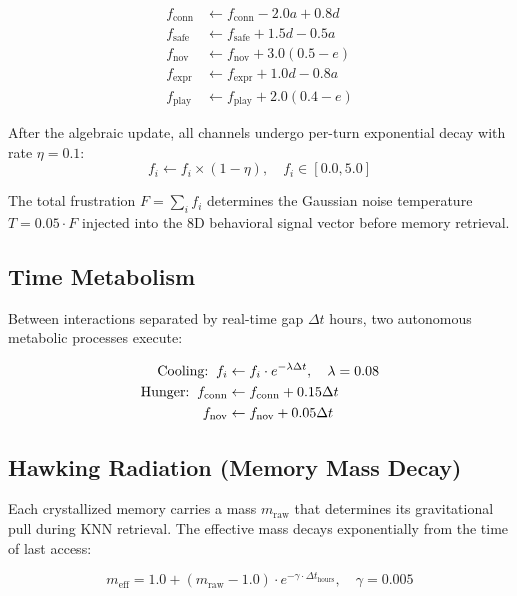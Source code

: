\begin{align}
  f_{\text{conn}} &\leftarrow f_{\text{conn}} - 2.0a + 0.8d \\
  f_{\text{safe}} &\leftarrow f_{\text{safe}} + 1.5d - 0.5a \\
  f_{\text{nov}} &\leftarrow f_{\text{nov}} + 3.0(0.5 - e) \\
  f_{\text{expr}} &\leftarrow f_{\text{expr}} + 1.0d - 0.8a \\
  f_{\text{play}} &\leftarrow f_{\text{play}} + 2.0(0.4 - e)
\end{align}

\noindent After the algebraic update, all channels undergo per-turn exponential decay with rate $\eta = 0.1$:
\begin{equation}
  f_i \leftarrow f_i \times (1 - \eta), \quad f_i \in [0.0, 5.0]
\end{equation}

The total frustration $F = \sum_i f_i$ determines the Gaussian noise temperature $T = 0.05 \cdot F$ injected into the 8D behavioral signal vector before memory retrieval.

\subsection{Time Metabolism}

Between interactions separated by real-time gap $\Delta t$ hours, two autonomous metabolic processes execute:

\begin{align}
  \text{Cooling:} \;\; f_i &\leftarrow f_i \cdot e^{-\lambda \Delta t}, \quad \lambda = 0.08 \\
  \text{Hunger:} \;\; f_{\text{conn}} &\leftarrow f_{\text{conn}} + 0.15\Delta t \notag \\
  f_{\text{nov}} &\leftarrow f_{\text{nov}} + 0.05\Delta t
\end{align}

\subsection{Hawking Radiation (Memory Mass Decay)}

Each crystallized memory carries a mass $m_{\text{raw}}$ that determines its gravitational pull during KNN retrieval. The effective mass decays exponentially from the time of last access:

\begin{equation}
  m_{\text{eff}} = 1.0 + (m_{\text{raw}} - 1.0) \cdot e^{-\gamma \cdot \Delta t_{\text{hours}}}, \quad \gamma = 0.005
\end{equation}

